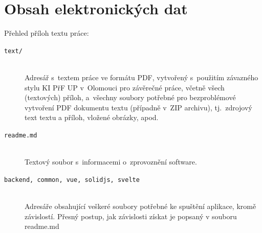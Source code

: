 \documentclass[
  master,
  program=ainf,
  printversion,
  tables=false,
  sourcecodes,
  glossaries,
  index
]{kidiplom}
\begin{document}
\appendix

\section{Obsah elektronických dat} \label{sec:ObsahData}

Přehled příloh textu práce:

\begin{description}

  \item[\texttt{text/}] \hfill \\
    Adresář s~textem práce ve formátu PDF, vytvořený s~použitím
    závazného stylu KI PřF UP v~Olomouci pro závěrečné práce, včetně
    všech (textových) příloh, a~všechny soubory potřebné pro
    bezproblémové vytvoření PDF dokumentu textu (případně v~ZIP
    archivu), tj.~zdrojový text textu a příloh, vložené obrázky, apod.

  \item[\texttt{readme.md}] \hfill \\
    Textový soubor s~informacemi o~zprovoznění software.

  \item[\texttt{backend, common, vue, solidjs, svelte}] \hfill \\
    Adresáře obsahující veškeré soubory potřebné ke spuštění aplikace, kromě závislostí.
    Přesný postup, jak závislosti získat je popsaný v souboru \\readme.md

\end{description}




\nocite{*}
\end{document}
